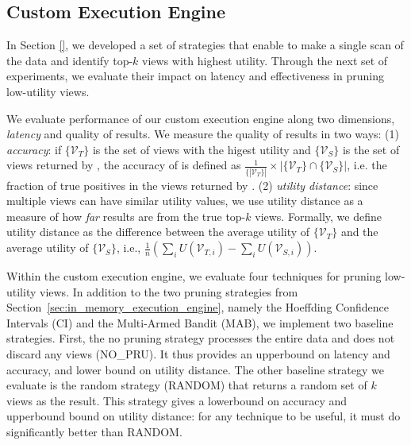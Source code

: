 \subsection{Custom Execution Engine}
\label{sec:custom_execution_engine_expts}
In Section \ref{}, we developed a set of strategies that enable \SeeDB to make a single scan
of the data and identify top-$k$ views with highest utility.
Through the next set of experiments, we evaluate 
their impact on latency and effectiveness in pruning low-utility views.

We evaluate performance of our custom execution engine along two dimensions, {\em latency} and
quality of results.
We measure the quality of results in two ways: 
(1) {\em accuracy}: if $\{\mathcal{V}_T\}$
is the set of views with the higest utility and $\{\mathcal{V}_S\}$ is the set of views returned by
\SeeDB, the accuracy of \SeeDB is defined as $\frac{1}{\{|\mathcal{V}_T\}|} \times 
|\{\mathcal{V}_T\} \cap \{\mathcal{V}_S\}|$, i.e. the
fraction of true positives in the views returned by \SeeDB. (2) {\em utility distance}: since multiple
views can have similar utility values, we use utility distance as a measure of how {\it far} \SeeDB 
results are from the true top-$k$ views. 
Formally, we define utility distance as the difference between the average utility of $\{\mathcal{V}_T\}$ 
and the average utility of $\{\mathcal{V}_S\}$, i.e., $\frac{1}{n}(\sum_{i}U(\mathcal{V}_{T,i}) - 
\sum_{i}U(\mathcal{V}_{S,i}))$.

Within the custom execution engine, we evaluate four techniques for pruning low-utility views.
In addition to the two pruning strategies from Section~\ref{sec:in_memory_execution_engine}, 
namely the Hoeffding Confidence Intervals (CI) and the Multi-Armed Bandit (MAB),
we implement two baseline strategies.
First, the no pruning strategy processes the entire data and does not discard any views (NO\_PRU). 
It thus provides an upperbound on latency and accuracy, and lower bound on utility distance.
The other baseline strategy we evaluate is the random strategy (RANDOM) that returns a random 
set of $k$ views as the result.
This strategy gives a lowerbound on accuracy and upperbound bound on utility distance: for any 
technique to be useful, it must do significantly better than RANDOM.

